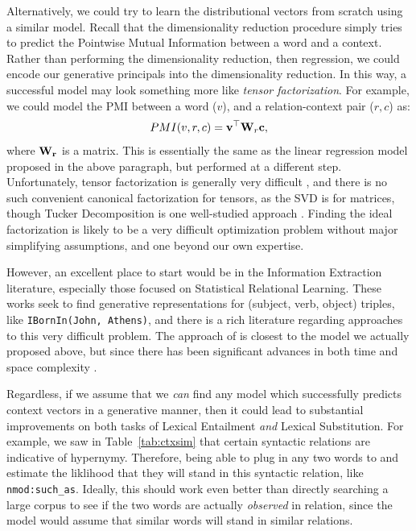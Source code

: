 \documentclass[12pt]{article}
\begin{document}
Alternatively, we could  try to learn the distributional vectors from scratch
using a similar model. Recall that the dimensionality reduction procedure
simply tries to predict the Pointwise Mutual Information between a word and
a context. Rather than performing the dimensionality reduction, then regression,
we could encode our generative principals into the dimensionality reduction.
In this way, a successful model may look something more like {\em tensor
factorization}. For example, we could model the PMI between a word ($v$),
and a relation-context pair ($r, c$) as:
\begin{equation*}
  PMI(v, r, c) = {\bf v}^\top {\bf W}_{r} {\bf c},
\end{equation*}
where ${\bf W_r}$ is a matrix. This is essentially the same as the linear
regression model proposed in the above paragraph, but performed at a different
step. Unfortunately, tensor factorization is generally very difficult
\cite{haastad:1990:ja,hillar:2013:jacm}, and there is no such convenient canonical factorization for
tensors, as the SVD is for matrices, though Tucker Decomposition
is one well-studied approach \cite{tucker:1966:psy}. Finding the ideal
factorization is likely to be a very difficult optimization problem without
major simplifying assumptions, and one beyond our own expertise.

However, an excellent place to start would be in the Information Extraction
literature, especially those focused on Statistical Relational Learning. These
works seek to find generative representations for (subject, verb, object)
triples, like {\tt IBornIn(John, Athens)}, and there is a rich literature
regarding approaches to this very difficult problem.
The approach of  is closest to the model we actually
proposed above, but since there has been significant advances in both time
and space complexity
\cite{socher:2013:nips,riedel:2013:naacl,yang:2014:iclr,kuleshov:2015:aistats,trouillon:2016:icml}.

Regardless, if we assume that we {\em can} find any model which successfully
predicts context vectors in a generative manner, then it could lead to
substantial improvements on both tasks of Lexical Entailment {\em and} Lexical
Substitution. For example, we saw in Table~\ref{tab:ctxsim} that certain
syntactic relations are indicative of hypernymy. Therefore, being able to plug
in any two words to and estimate the liklihood that they will stand in this
syntactic relation, like {\tt nmod:such\_as}. Ideally, this should work even
better than directly searching a large corpus to see if the two words are
actually {\em observed} in relation, since the model would assume that similar
words will stand in similar relations.
\end{document}
